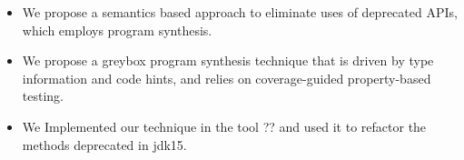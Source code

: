 \documentclass[sigconf,review,anonymous]{acmart}
\begin{document}
\begin{itemize}

\item We propose a semantics based approach to eliminate uses of deprecated APIs, which employs program synthesis.

\item We propose a greybox program synthesis technique that is driven by type information and code hints, and relies on coverage-guided property-based testing.
  
  
  


\item We Implemented our technique in the tool ?? and used it to refactor the methods deprecated in jdk15.
  
\end{itemize}  

%
\end{document}
